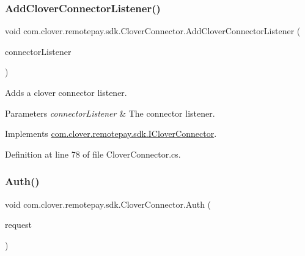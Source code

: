 \subsubsection{\texorpdfstring{Add\+Clover\+Connector\+Listener()}{AddCloverConnectorListener()}}
{\footnotesize\ttfamily void com.\+clover.\+remotepay.\+sdk.\+Clover\+Connector.\+Add\+Clover\+Connector\+Listener (\begin{DoxyParamCaption}\item[{\hyperlink{interfacecom_1_1clover_1_1remotepay_1_1sdk_1_1_i_clover_connector_listener}{I\+Clover\+Connector\+Listener}}]{connector\+Listener }\end{DoxyParamCaption})}



Adds a clover connector listener. 


\begin{DoxyParams}{Parameters}
{\em connector\+Listener} & The connector listener.\\
\hline
\end{DoxyParams}


Implements \hyperlink{interfacecom_1_1clover_1_1remotepay_1_1sdk_1_1_i_clover_connector_a90fcd7781afc36d654e42b1c9daada87}{com.\+clover.\+remotepay.\+sdk.\+I\+Clover\+Connector}.



Definition at line 78 of file Clover\+Connector.\+cs.

\mbox{\label{classcom_1_1clover_1_1remotepay_1_1sdk_1_1_clover_connector_a2ae641aff3f22e4c5fa651d8deaa7bbd}} 
\subsubsection{\texorpdfstring{Auth()}{Auth()}}
{\footnotesize\ttfamily void com.\+clover.\+remotepay.\+sdk.\+Clover\+Connector.\+Auth (\begin{DoxyParamCaption}\item[{\hyperlink{classcom_1_1clover_1_1remotepay_1_1sdk_1_1_auth_request}{Auth\+Request}}]{request }\end{DoxyParamCaption})}



